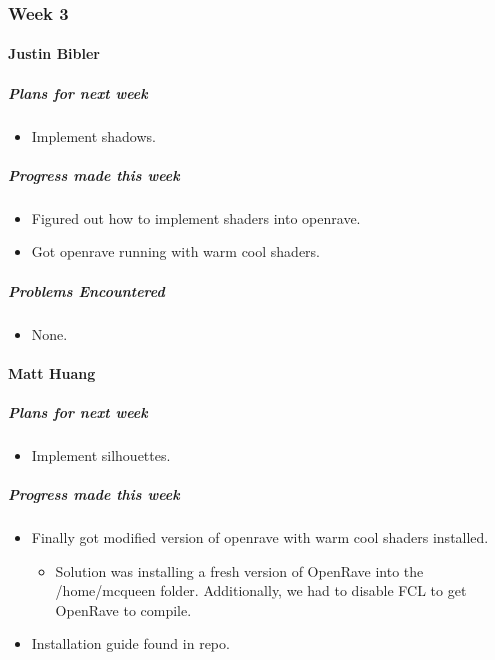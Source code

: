 {
\subsubsection{Week 3}
\paragraph{Justin Bibler}
\subparagraph{Plans for next week}
\begin{itemize}
  \item Implement shadows.
\end{itemize}

\subparagraph{Progress made this week}
\begin{itemize}
  \item Figured out how to implement shaders into openrave.
  \item Got openrave running with warm cool shaders.
\end{itemize}

\subparagraph{Problems Encountered}
\begin{itemize}
  \item None.
\end{itemize}
\vspace{3mm}

\paragraph{Matt Huang}
\subparagraph{Plans for next week}
\begin{itemize}
  \item Implement silhouettes.
\end{itemize}

\subparagraph{Progress made this week}
\begin{itemize}
  \item Finally got modified version of openrave with warm cool shaders installed.
  \begin{itemize}
    \item Solution was installing a fresh version of OpenRave into the /home/mcqueen folder. Additionally, we had to disable FCL to get OpenRave to compile.
  \end{itemize}
  \item Installation guide found in repo.
\end{itemize}

}
